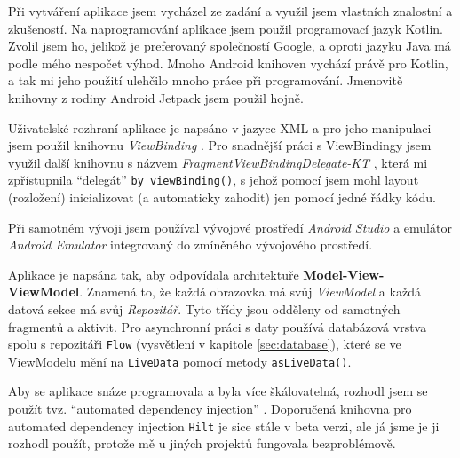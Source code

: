 \documentclass[../TakeYourPill.tex]{subfiles}
\begin{document}
Při vytváření aplikace jsem vycházel ze zadání a využil jsem vlastních znalostní a zkušeností. Na naprogramování aplikace jsem použil programovací jazyk Kotlin. Zvolil jsem ho, jelikož je preferovaný společností Google, a oproti jazyku Java má podle mého nespočet výhod. Mnoho Android knihoven vychází právě pro Kotlin, a tak mi jeho použití ulehčilo mnoho práce při programování. Jmenovitě knihovny z rodiny Android Jetpack \cite{jetpack} jsem použil hojně.

Uživatelské rozhraní aplikace je napsáno v jazyce XML a pro jeho manipulaci jsem použil knihovnu \textit{ViewBinding} \cite{viewbinding}. Pro snadnější práci s ViewBindingy jsem využil další knihovnu s názvem \textit{FragmentViewBindingDelegate-KT} \cite{delegate}\cite{delegate2}, která mi zpřístupnila \enquote{delegát} \texttt{by viewBinding()}, s jehož pomocí jsem mohl layout (rozložení) inicializovat (a automaticky zahodit) jen pomocí jedné řádky kódu.

Při samotném vývoji jsem používal vývojové prostředí \textit{Android Studio} \cite{studio} a emulátor \textit{Android Emulator} integrovaný do zmíněného vývojového prostředí.

Aplikace je napsána tak, aby odpovídala architektuře \textbf{Model-View-ViewModel}. Znamená to, že každá obrazovka má svůj \textit{ViewModel} a každá datová sekce má svůj \textit{Repozitář}. Tyto třídy jsou odděleny od samotných fragmentů a aktivit. Pro asynchronní práci s daty používá databázová vrstva spolu s repozitáři \texttt{Flow} \cite{flow} (vysvětlení v kapitole \ref{sec:database}), které se ve ViewModelu mění na \texttt{LiveData} \cite{livedata} pomocí metody \texttt{asLiveData()}.






Aby se aplikace snáze programovala a byla více škálovatelná, rozhodl jsem se použít tvz. \enquote{automated dependency injection} \cite{di}. Doporučená knihovna pro automated dependency injection \texttt{Hilt} \cite{hilt} je sice stále v beta verzi, ale já jsme je ji rozhodl použít, protože mě u jiných projektů fungovala bezproblémově.


\end{document}
